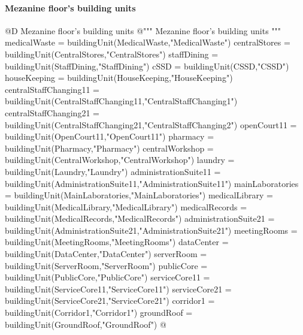 \documentclass[11pt,oneside]{article}    %
\begin{document}
\paragraph{Mezanine floor's building units}
@D Mezanine floor's building units 
@{""" Mezanine floor's building units """
medicalWaste = buildingUnit(MedicalWaste,"MedicalWaste")
centralStores = buildingUnit(CentralStores,"CentralStores")
staffDining = buildingUnit(StaffDining,"StaffDining")
cSSD = buildingUnit(CSSD,"CSSD")
houseKeeping = buildingUnit(HouseKeeping,"HouseKeeping")
centralStaffChanging11 = buildingUnit(CentralStaffChanging11,"CentralStaffChanging1")
centralStaffChanging21 = buildingUnit(CentralStaffChanging21,"CentralStaffChanging2")
openCourt11 = buildingUnit(OpenCourt11,"OpenCourt11") 
pharmacy = buildingUnit(Pharmacy,"Pharmacy")
centralWorkshop = buildingUnit(CentralWorkshop,"CentralWorkshop")
laundry = buildingUnit(Laundry,"Laundry")
administrationSuite11 = buildingUnit(AdministrationSuite11,"AdministrationSuite11")
mainLaboratories = buildingUnit(MainLaboratories,"MainLaboratories")
medicalLibrary = buildingUnit(MedicalLibrary,"MedicalLibrary")
medicalRecords = buildingUnit(MedicalRecords,"MedicalRecords")
administrationSuite21 = buildingUnit(AdministrationSuite21,"AdministrationSuite21")
meetingRooms = buildingUnit(MeetingRooms,"MeetingRooms")
dataCenter = buildingUnit(DataCenter,"DataCenter")
serverRoom = buildingUnit(ServerRoom,"ServerRoom")
publicCore = buildingUnit(PublicCore,"PublicCore")
serviceCore11 = buildingUnit(ServiceCore11,"ServiceCore11")
serviceCore21 = buildingUnit(ServiceCore21,"ServiceCore21")
corridor1 = buildingUnit(Corridor1,"Corridor1")
groundRoof = buildingUnit(GroundRoof,"GroundRoof")
@}
\end{document}
